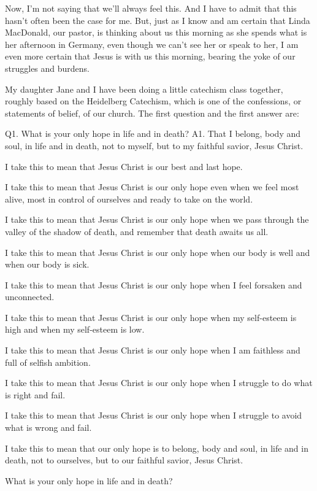 \documentclass[11pt]{article}
\begin{document}
Now, I'm not saying that we'll always feel this. And I have to
admit that this hasn't often been the case for me. But, just as I
know and am certain that Linda MacDonald, our pastor, is thinking
about us this morning as she spends what is her afternoon in
Germany, even though we can't see her or speak to her, I am even
more certain that Jesus is with us this morning, bearing the yoke
of our struggles and burdens.

My daughter Jane and I have been doing a little catechism class
together, roughly based on the Heidelberg Catechism, which is one
of the confessions, or statements of belief, of our church.  The
first question and the first answer are:

Q1. What is your only hope in life and in death? A1. That I
belong, body and soul, in life and in death, not to myself, but to
my faithful savior, Jesus Christ.

I take this to mean that Jesus Christ is our best and last hope.

I take this to mean that Jesus Christ is our only hope even when
we feel most alive, most in control of ourselves and ready to take
on the world.

I take this to mean that Jesus Christ is our only hope when we
pass through the valley of the shadow of death, and remember that
death awaits us all.

I take this to mean that Jesus Christ is our only hope when our
body is well and when our body is sick.

I take this to mean that Jesus Christ is our only hope when I feel
forsaken and unconnected.

I take this to mean that Jesus Christ is our only hope when my
self-esteem is high and when my self-esteem is low.

I take this to mean that Jesus Christ is our only hope when I am
faithless and full of selfish ambition.

I take this to mean that Jesus Christ is our only hope when I
struggle to do what is right and fail.

I take this to mean that Jesus Christ is our only hope when I
struggle to avoid what is wrong and fail.

I take this to mean that our only hope is to belong, body and
soul, in life and in death, not to ourselves, but to our faithful
savior, Jesus Christ.

What is your only hope in life and in death?
\end{document}
